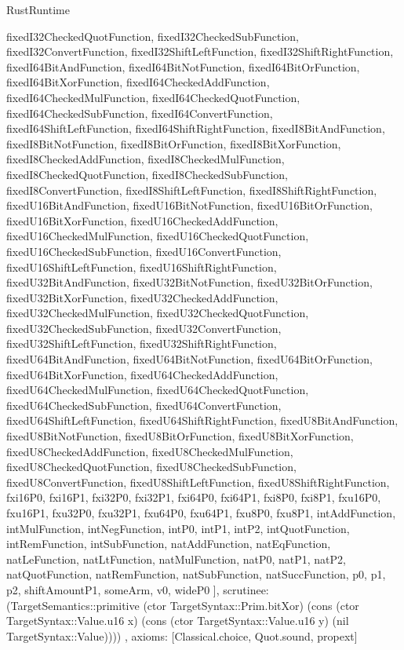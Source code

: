 \begin{lexlean}{RustRuntime}
\begin{semanticmodule}
{{      fixedI32CheckedQuotFunction,
      fixedI32CheckedSubFunction,
      fixedI32ConvertFunction,
      fixedI32ShiftLeftFunction,
      fixedI32ShiftRightFunction,
      fixedI64BitAndFunction,
      fixedI64BitNotFunction,
      fixedI64BitOrFunction,
      fixedI64BitXorFunction,
      fixedI64CheckedAddFunction,
      fixedI64CheckedMulFunction,
      fixedI64CheckedQuotFunction,
      fixedI64CheckedSubFunction,
      fixedI64ConvertFunction,
      fixedI64ShiftLeftFunction,
      fixedI64ShiftRightFunction,
      fixedI8BitAndFunction,
      fixedI8BitNotFunction,
      fixedI8BitOrFunction,
      fixedI8BitXorFunction,
      fixedI8CheckedAddFunction,
      fixedI8CheckedMulFunction,
      fixedI8CheckedQuotFunction,
      fixedI8CheckedSubFunction,
      fixedI8ConvertFunction,
      fixedI8ShiftLeftFunction,
      fixedI8ShiftRightFunction,
      fixedU16BitAndFunction,
      fixedU16BitNotFunction,
      fixedU16BitOrFunction,
      fixedU16BitXorFunction,
      fixedU16CheckedAddFunction,
      fixedU16CheckedMulFunction,
      fixedU16CheckedQuotFunction,
      fixedU16CheckedSubFunction,
      fixedU16ConvertFunction,
      fixedU16ShiftLeftFunction,
      fixedU16ShiftRightFunction,
      fixedU32BitAndFunction,
      fixedU32BitNotFunction,
      fixedU32BitOrFunction,
      fixedU32BitXorFunction,
      fixedU32CheckedAddFunction,
      fixedU32CheckedMulFunction,
      fixedU32CheckedQuotFunction,
      fixedU32CheckedSubFunction,
      fixedU32ConvertFunction,
      fixedU32ShiftLeftFunction,
      fixedU32ShiftRightFunction,
      fixedU64BitAndFunction,
      fixedU64BitNotFunction,
      fixedU64BitOrFunction,
      fixedU64BitXorFunction,
      fixedU64CheckedAddFunction,
      fixedU64CheckedMulFunction,
      fixedU64CheckedQuotFunction,
      fixedU64CheckedSubFunction,
      fixedU64ConvertFunction,
      fixedU64ShiftLeftFunction,
      fixedU64ShiftRightFunction,
      fixedU8BitAndFunction,
      fixedU8BitNotFunction,
      fixedU8BitOrFunction,
      fixedU8BitXorFunction,
      fixedU8CheckedAddFunction,
      fixedU8CheckedMulFunction,
      fixedU8CheckedQuotFunction,
      fixedU8CheckedSubFunction,
      fixedU8ConvertFunction,
      fixedU8ShiftLeftFunction,
      fixedU8ShiftRightFunction,
      fxi16P0,
      fxi16P1,
      fxi32P0,
      fxi32P1,
      fxi64P0,
      fxi64P1,
      fxi8P0,
      fxi8P1,
      fxu16P0,
      fxu16P1,
      fxu32P0,
      fxu32P1,
      fxu64P0,
      fxu64P1,
      fxu8P0,
      fxu8P1,
      intAddFunction,
      intMulFunction,
      intNegFunction,
      intP0,
      intP1,
      intP2,
      intQuotFunction,
      intRemFunction,
      intSubFunction,
      natAddFunction,
      natEqFunction,
      natLeFunction,
      natLtFunction,
      natMulFunction,
      natP0,
      natP1,
      natP2,
      natQuotFunction,
      natRemFunction,
      natSubFunction,
      natSuccFunction,
      p0,
      p1,
      p2,
      shiftAmountP1,
      someArm,
      v0,
      wideP0
    ],
    scrutinee: (TargetSemantics::primitive (ctor TargetSyntax::Prim.bitXor) (cons (ctor TargetSyntax::Value.u16 x) (cons (ctor TargetSyntax::Value.u16 y) (nil TargetSyntax::Value))))
  },
  axioms: [Classical.choice, Quot.sound, propext]
}


\end{semanticmodule}
\end{lexlean}
